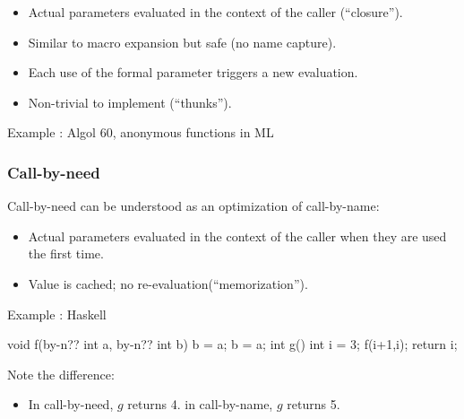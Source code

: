 \documentclass{beamer}
\begin{document}
\begin{frame}[fragile]
\begin{itemize}
\item Actual parameters evaluated in the context of the caller 
(``closure'').
\item Similar to macro expansion but safe (no name capture). 
\item Each use  of the formal parameter triggers a new
evaluation. 
\item Non-trivial to implement (``thunks''). 
\end{itemize}

 Example : Algol 60, anonymous functions in ML
\bigskip

\end{frame}

\begin{frame}[fragile]
\frametitle{Call-by-need}
Call-by-need can be understood as an optimization of
call-by-name:

\begin{itemize}
\item Actual parameters evaluated in the context of the caller
when they are used the first time.
\item Value is cached; no re-evaluation(``memorization''). 
\end{itemize}

 Example : Haskell

\begin{cplus3}

void f(by-n?? int a, by-n?? int b) {
    b = a;
    b = a;
}
int g() {
    int i = 3;
    f(i+1,i);
    return i;
}
\end{cplus3}
Note the difference:
\begin{itemize}
\item In call-by-need, $g$ returns 4.
in call-by-name, $g$ returns 5.

\end{itemize}





\end{frame}

\end{document}
